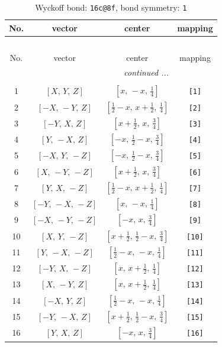 \documentclass[fleqn,8pt]{jsarticle}
\begin{document}
\begin{longtable}{cccc}
\caption{Wyckoff bond: {\tt 16c@8f}, bond symmetry: {\tt 1}}
 \\
 \hline \hline
No. & vector & center & mapping \\ \hline \endfirsthead

\multicolumn{3}{l}{\tablename\ \thetable{}} \\
 \hline \hline
No. & vector & center & mapping \\ \hline \endhead

 \hline \hline
\multicolumn{3}{r}{\footnotesize\it continued ...} \\ \endfoot

 \hline \hline
\multicolumn{3}{r}{} \\ \endlastfoot

1 & $\left[ X,\, Y,\, Z \right]$ & $\left[ x,\, - x,\, \frac{1}{4} \right]$ & {\tt [1]} \\ \hline
2 & $\left[ - X,\, - Y,\, Z \right]$ & $\left[ \frac{1}{2} - x,\, x + \frac{1}{2},\, \frac{1}{4} \right]$ & {\tt [2]} \\ \hline
3 & $\left[ - Y,\, X,\, Z \right]$ & $\left[ x + \frac{1}{2},\, x,\, \frac{3}{4} \right]$ & {\tt [3]} \\ \hline
4 & $\left[ Y,\, - X,\, Z \right]$ & $\left[ - x,\, \frac{1}{2} - x,\, \frac{3}{4} \right]$ & {\tt [4]} \\ \hline
5 & $\left[ - X,\, Y,\, - Z \right]$ & $\left[ - x,\, \frac{1}{2} - x,\, \frac{3}{4} \right]$ & {\tt [5]} \\ \hline
6 & $\left[ X,\, - Y,\, - Z \right]$ & $\left[ x + \frac{1}{2},\, x,\, \frac{3}{4} \right]$ & {\tt [6]} \\ \hline
7 & $\left[ Y,\, X,\, - Z \right]$ & $\left[ \frac{1}{2} - x,\, x + \frac{1}{2},\, \frac{1}{4} \right]$ & {\tt [7]} \\ \hline
8 & $\left[ - Y,\, - X,\, - Z \right]$ & $\left[ x,\, - x,\, \frac{1}{4} \right]$ & {\tt [8]} \\ \hline
9 & $\left[ - X,\, - Y,\, - Z \right]$ & $\left[ - x,\, x,\, \frac{3}{4} \right]$ & {\tt [9]} \\ \hline
10 & $\left[ X,\, Y,\, - Z \right]$ & $\left[ x + \frac{1}{2},\, \frac{1}{2} - x,\, \frac{3}{4} \right]$ & {\tt [10]} \\ \hline
11 & $\left[ Y,\, - X,\, - Z \right]$ & $\left[ \frac{1}{2} - x,\, - x,\, \frac{1}{4} \right]$ & {\tt [11]} \\ \hline
12 & $\left[ - Y,\, X,\, - Z \right]$ & $\left[ x,\, x + \frac{1}{2},\, \frac{1}{4} \right]$ & {\tt [12]} \\ \hline
13 & $\left[ X,\, - Y,\, Z \right]$ & $\left[ x,\, x + \frac{1}{2},\, \frac{1}{4} \right]$ & {\tt [13]} \\ \hline
14 & $\left[ - X,\, Y,\, Z \right]$ & $\left[ \frac{1}{2} - x,\, - x,\, \frac{1}{4} \right]$ & {\tt [14]} \\ \hline
15 & $\left[ - Y,\, - X,\, Z \right]$ & $\left[ x + \frac{1}{2},\, \frac{1}{2} - x,\, \frac{3}{4} \right]$ & {\tt [15]} \\ \hline
16 & $\left[ Y,\, X,\, Z \right]$ & $\left[ - x,\, x,\, \frac{3}{4} \right]$ & {\tt [16]} \\
\end{longtable}
\end{document}
